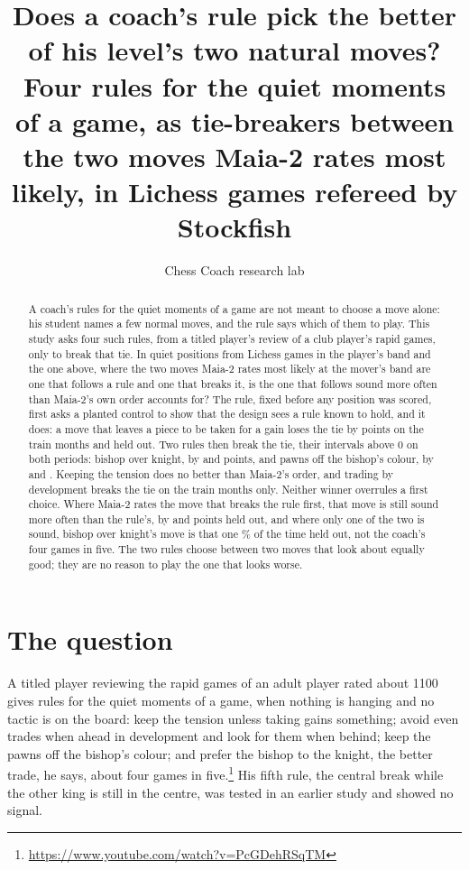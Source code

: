 \documentclass[11pt]{article}
\title{Does a coach's rule pick the better of his level's two natural moves?\\[0.3em]
\large Four rules for the quiet moments of a game, as tie-breakers between the two moves Maia-2
rates most likely, in \Games{} Lichess games refereed by Stockfish}
\author{Chess Coach research lab}
\date{}
\begin{document}
\maketitle

\begin{abstract}
A coach's rules for the quiet moments of a game are not meant to choose a move alone: his student
names a few normal moves, and the rule says which of them to play. This study asks four such rules,
from a titled player's review of a club player's rapid games, only to break that tie. In quiet
positions from \Games{} Lichess games in the player's band and the one above, where the two moves
Maia-2 rates most likely at the mover's band are one that follows a rule and one that breaks it, is
the one that follows sound more often than Maia-2's own order accounts for? The rule, fixed before
any position was scored, first asks a planted control to show that the design sees a rule known to
hold, and it does: a move that leaves a piece to be taken for a gain loses the tie by
\ControlTrain{} points on the train months and \ControlHeld{} held out. Two rules then break the
tie, their intervals above 0 on both periods: bishop over knight, by \BkTrain{} and \BkHeld{}
points, and pawns off the bishop's colour, by \ColTrain{} and \ColHeld. Keeping the tension does no
better than Maia-2's order, and trading by development breaks the tie on the train months only.
Neither winner overrules a first choice. Where Maia-2 rates the move that breaks the rule first,
that move is still sound more often than the rule's, by \BkBfHeld{} and \ColBfHeld{} points held
out, and where only one of the two is sound, bishop over knight's move is that one \BkOneHeld\% of
the time held out, not the coach's four games in five. The two rules choose between two moves that
look about equally good; they are no reason to play the one that looks worse.
\end{abstract}

\section{The question}

A titled player reviewing the rapid games of an adult player rated about 1100 gives rules for the
quiet moments of a game, when nothing is hanging and no tactic is on the board: keep the tension
unless taking gains something; avoid even trades when ahead in development and look for them when
behind; keep the pawns off the bishop's colour; and prefer the bishop to the knight, the better
trade, he says, about four games in five.\footnote{\url{https://www.youtube.com/watch?v=PcGDehRSqTM}}
His fifth rule, the central break while the other king is still in the centre, was tested in an
earlier study and showed no signal.
\end{document}
